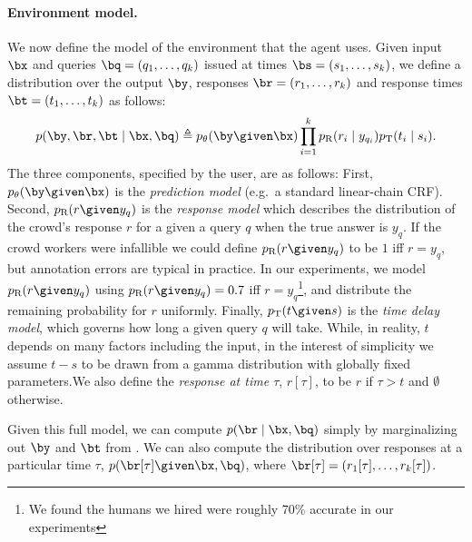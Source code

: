 
\paragraph{Environment model.}

We now define the model of the environment that the agent uses.
Given input $\bx$ and queries $\bq = (q_1, \dots, q_k)$ issued at times $\bs = (s_1, \dots, s_k)$,
we define a distribution over the output $\by$, responses $\br = (r_1, \dots, r_k)$
and response times $\bt = (t_1, \dots, t_k)$ as follows:
\begin{align}
  \label{eqn:dynamics}
p(\by, \br, \bt \mid \bx, \bq) \eqdef \p(\by \given \bx) \prod_{i=1}^k \presp(r_i \mid y_{q_i}) \ptime(t_i \mid s_i).
\end{align}
The three components, specified by the user, are as follows:
First, $\p(\by \given \bx)$ is the \emph{prediction model} (e.g.\ a standard linear-chain CRF).
Second, $\presp(r \given y_q)$ is the \emph{response model} which describes the distribution of the crowd's response $r$ for a given a query $q$ when the true answer is $y_q$.
%
If the crowd workers were infallible we could define $\presp(r \given y_q)$ to be $1$ iff $r = y_q$, but annotation errors are typical in practice. 
In our experiments, we model $\presp(r \given y_q)$ using $\presp(r \given y_q) = 0.7$ iff $r = y_q$\footnote{ We found the humans we hired were roughly 70\% accurate in our experiments}, and distribute the remaining probability for $r$ uniformly.
%
Finally, $\ptime(t \given s)$ is the \emph{time delay model}, which governs how long a given query $q$ will take. While, in reality, $t$ depends on many factors including the input, in the interest of simplicity we assume $t - s$ to be drawn from a gamma distribution with globally fixed parameters.We also define the \emph{response at time $\tau$}, $r[\tau]$, to be $r$ if $\tau > t$ and $\emptyset$ otherwise.

Given this full model, we can compute $p(\br \mid \bx, \bq)$ simply by marginalizing out $\by$ and $\bt$ from .
We can also compute the distribution over responses at a particular time $\tau$, $p(\br[\tau] \given \bx, \bq)$, where $\br[\tau] = (r_1[\tau], \ldots, r_k[\tau])$.

